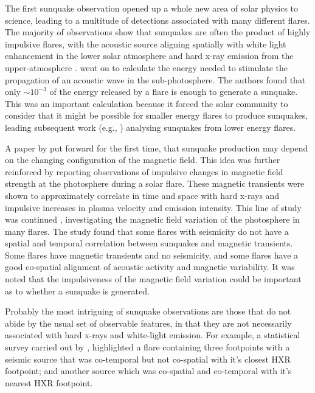 The first sunquake observation opened up a whole new area of solar physics to science, leading to a multitude of detections associated with many different flares. The majority of observations show that sunquakes are often the product of highly impulsive flares, with the acoustic source aligning spatially with white light enhancement in the lower solar atmosphere and hard x-ray emission from the upper-atmosphere \citep{2005ApJ...630.1168D, 2007ApJ...664..573Z}. \cite{2005ApJ...630.1168D} went on to calculate the energy needed to stimulate the propagation of an acoustic wave in the sub-photosphere. The authors found that only $\sim10^{-3}$ of the energy released by a flare is enough to generate a sunquake. This was an important calculation because it forced the solar community to consider that it might be possible for smaller energy flares to produce sunquakes, leading subsequent work (e.g., \cite{2008SoPh..251..613M}) analysing sunquakes from lower energy flares.

A paper by \cite{2000ApJ...531L..75H} put forward for the first time, that sunquake production may depend on the changing configuration of the magnetic field. This idea was further reinforced by \cite{2001ApJ...550L.105K} reporting observations of impulsive changes in magnetic field strength at the photosphere during a solar flare. These magnetic transients were shown to approximately correlate in time and space with hard x-rays and impulsive increases in plasma velocity and emission intensity. This line of study was continued \citep{2009MNRAS.395L..39M}, investigating the magnetic field variation of the photosphere in many flares. The study found that some flares with seismicity do not have a spatial and temporal correlation between sunquakes and magnetic transients. Some flares have magnetic transients and no seismicity, and some flares have a good co-spatial alignment of acoustic activity and magnetic variability. It was noted that the impulsiveness of the magnetic field variation could be important as to whether a sunquake is generated.

Probably the most intriguing of sunquake observations are those that do not abide by the usual set of observable features, in that they are not necessarily associated with hard x-rays and white-light emission. For example, a statistical survey carried out by \cite{2012SoPh..277..317P}, highlighted a flare containing three footpoints with a seismic source that was co-temporal but not co-spatial with it's closest HXR footpoint; and another source which was co-spatial and co-temporal with it's nearest HXR footpoint.

